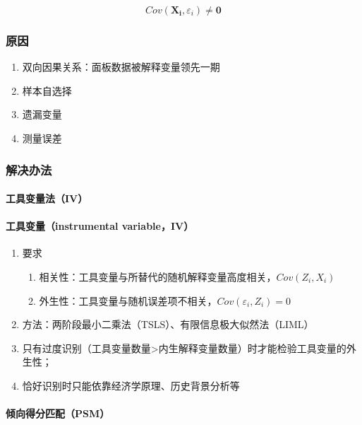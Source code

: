 \documentclass[12pt]{book}
\begin{document}
$$
Cov(\mathbf{X_i},\varepsilon_i)\neq\mathbf{0}
$$

\subsubsection{原因}

\begin{enumerate}[1.]
    \item 双向因果关系：面板数据被解释变量领先一期
    \item 样本自选择
    \item 遗漏变量
    \item 测量误差
\end{enumerate}


\subsubsection{解决办法}




\paragraph{工具变量法（IV）}

\paragraph{工具变量（instrumental variable，IV）}


\begin{enumerate}[1.]
    \item 要求
    \begin{enumerate}[(1)]
        \item 相关性：工具变量与所替代的随机解释变量高度相关，$Cov(Z_i,X_i)$  
        \item 外生性：工具变量与随机误差项不相关，$Cov(\varepsilon_i,Z_i)=0$  
    \end{enumerate}
    \item 方法：两阶段最小二乘法（TSLS）、有限信息极大似然法（LIML）
    \item 只有过度识别（工具变量数量>内生解释变量数量）时才能检验工具变量的外生性；  
    \item 恰好识别时只能依靠经济学原理、历史背景分析等
\end{enumerate}




\paragraph{倾向得分匹配（PSM）}
\end{document}
